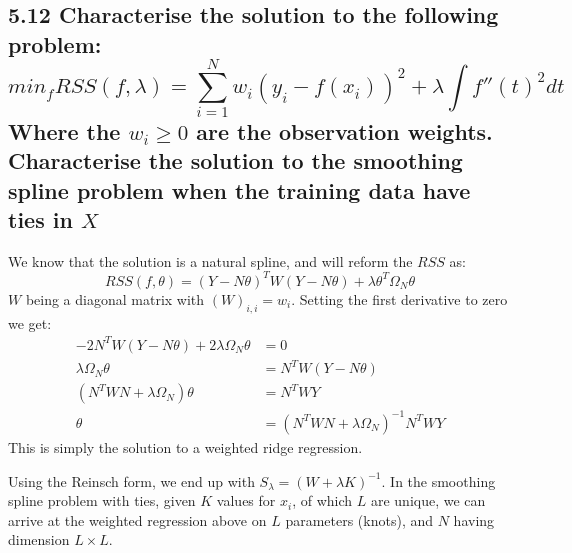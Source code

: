 \subsection*{5.12 
Characterise the solution to the following problem:
$$ min_f RSS(f, \lambda) = \sum_{i=1}^N w_i \left( y_i - f(x_i)\right)^2 + \lambda \int f''(t)^2 dt $$
Where the $w_i \geq 0$ are the observation weights. Characterise the solution to the smoothing spline problem when the training data have ties in $X$}

We know that the solution is a natural spline, and will reform the $RSS$ as:
$$RSS(f, \theta) = \left(Y - N\theta \right)^T W \left(Y - N\theta\right) + \lambda \theta^T \Omega_N \theta$$
$W$ being a diagonal matrix with $(W)_{i,i} = w_i$.
Setting the first derivative to zero we get:
\begin{align*}
-2 N^T W \left(Y - N\theta\right) + 2 \lambda \Omega_N \theta &= 0\\
\lambda \Omega_N \theta  &= N^T W \left(Y - N\theta\right)\\
\left( N^T W N + \lambda \Omega_N\right) \theta &= N^T W Y \\
 \theta &= \left( N^T W N + \lambda \Omega_N\right)^{-1} N^T W Y 
\end{align*}
This is simply the solution to a weighted ridge regression.

Using the Reinsch form, we end up with $S_\lambda = \left( W + \lambda K \right)^{-1}$.
In the smoothing spline problem with ties, given $K$ values for $x_i$, of which $L$ are unique, we can arrive at the weighted regression above on $L$ parameters (knots), and $N$ having dimension $L \times L$.
